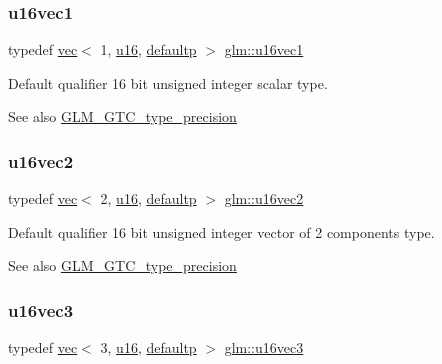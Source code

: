 \subsubsection{\texorpdfstring{u16vec1}{u16vec1}}
{\footnotesize\ttfamily typedef \hyperlink{structglm_1_1vec}{vec}$<$ 1, \hyperlink{group__gtc__type__precision_gae7a1571503f83d2264ddfa705a6b082a}{u16}, \hyperlink{namespaceglm_a36ed105b07c7746804d7fdc7cc90ff25a9d21ccd8b5a009ec7eb7677befc3bf51}{defaultp} $>$ \hyperlink{group__gtc__type__precision_ga40d9e5ab8120f10efcfd7c88436c4a81}{glm\+::u16vec1}}

Default qualifier 16 bit unsigned integer scalar type. \begin{DoxySeeAlso}{See also}
\hyperlink{group__gtc__type__precision}{G\+L\+M\+\_\+\+G\+T\+C\+\_\+type\+\_\+precision} 
\end{DoxySeeAlso}
\mbox{\label{group__gtc__type__precision_ga50bd2ceeb100a187e7c46f135269a0ec}} 
\subsubsection{\texorpdfstring{u16vec2}{u16vec2}}
{\footnotesize\ttfamily typedef \hyperlink{structglm_1_1vec}{vec}$<$ 2, \hyperlink{group__gtc__type__precision_gae7a1571503f83d2264ddfa705a6b082a}{u16}, \hyperlink{namespaceglm_a36ed105b07c7746804d7fdc7cc90ff25a9d21ccd8b5a009ec7eb7677befc3bf51}{defaultp} $>$ \hyperlink{group__gtc__type__precision_ga50bd2ceeb100a187e7c46f135269a0ec}{glm\+::u16vec2}}

Default qualifier 16 bit unsigned integer vector of 2 components type. \begin{DoxySeeAlso}{See also}
\hyperlink{group__gtc__type__precision}{G\+L\+M\+\_\+\+G\+T\+C\+\_\+type\+\_\+precision} 
\end{DoxySeeAlso}
\mbox{\label{group__gtc__type__precision_gad60f14d1abd39b480cbe5c5cf848071a}} 
\subsubsection{\texorpdfstring{u16vec3}{u16vec3}}
{\footnotesize\ttfamily typedef \hyperlink{structglm_1_1vec}{vec}$<$ 3, \hyperlink{group__gtc__type__precision_gae7a1571503f83d2264ddfa705a6b082a}{u16}, \hyperlink{namespaceglm_a36ed105b07c7746804d7fdc7cc90ff25a9d21ccd8b5a009ec7eb7677befc3bf51}{defaultp} $>$ \hyperlink{group__gtc__type__precision_gad60f14d1abd39b480cbe5c5cf848071a}{glm\+::u16vec3}}

